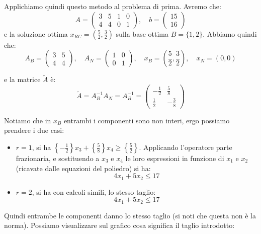 \documentclass[a4paper,11pt]{article}
\begin{document}
Applichiamo quindi questo metodo al problema di prima.
Avremo che:
$$
A= \begin{pmatrix}
	3 & 5 & 1 & 0 \\ 4 & 4 & 0 & 1
\end{pmatrix}, \quad 
b= \begin{pmatrix}
15 \\ 16
\end{pmatrix}
$$
e la soluzione ottima $x_{RC} = \left( \frac{5}{2}, \frac{3}{2} \right)$ sulla base ottima $B = \{1,2\}$.
Abbiamo quindi che:
$$
A_B = \begin{pmatrix}
	3 & 5 \\ 4 & 4 
\end{pmatrix}, \quad 
A_N = \begin{pmatrix}
	1 & 0 \\ 0 & 1
\end{pmatrix}, \quad 
x_B = \left( \frac{5}{2}, \frac{3}{2} \right), \quad 
x_N = ( 0, 0 )
$$

e la matrice $\tilde{A}$ è:
$$
\tilde{A} = A_B^{-1} A_N = A_B^{-1} = \begin{pmatrix}
	-\frac{1}{2} & \frac{5}{8} \\ \frac{1}{2} & -\frac{3}{8}
\end{pmatrix} 
$$

Notiamo che in $x_B$ entrambi i componenti sono non interi, ergo possiamo prendere i due casi:
\begin{itemize}
	\item $r=1$, si ha $\left\{ -\frac{1}{2}  \right\} x_3 + \left\{ \frac{5}{8} \right\} x_4 \geq \left\{ \frac{5}{2} \right\}$. Applicando l'operatore parte frazionaria, e sostituendo a $x_3$ e $x_4$ le loro espressioni in funzione di $x_1$ e $x_2$ (ricavate dalle equazioni del poliedro) si ha:
		$$ 4x_1 + 5x_2 \leq 17 $$
	\item $r=2$, si ha con calcoli simili, lo stesso taglio:
		$$ 4x_1 + 5x_2 \leq 17 $$
\end{itemize}

Quindi entrambe le componenti danno lo stesso taglio (si noti che questa non è la norma).
Possiamo visualizzare sul grafico cosa significa il taglio introdotto:
\end{document}
